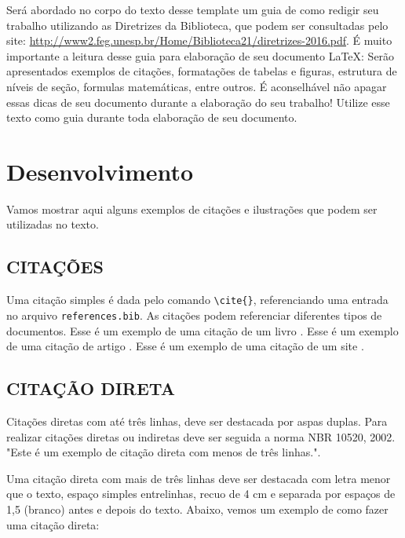 \documentclass[
  12pt,		%
  a4paper,	%
  openright,%
  oneside,	%
  chapter=TITLE,		%
  section=TITLE,		%
  english,	%
  french,	%
  spanish,	%
  brazil	%
]{abntex2}
\begin{document}
    Será abordado no corpo do texto desse template um guia de como redigir seu trabalho utilizando as Diretrizes da Biblioteca, que podem ser consultadas pelo site: \url{http://www2.feg.unesp.br/Home/Biblioteca21/diretrizes-2016.pdf}. É muito importante a leitura desse guia para elaboração de seu documento \LaTeX: Serão apresentados exemplos de citações, formatações de tabelas e figuras, estrutura de níveis de seção, formulas matemáticas, entre outros. É aconselhável não apagar essas dicas de seu documento durante a elaboração do seu trabalho! Utilize esse texto como guia durante toda elaboração de seu documento.
    
    \chapter{Desenvolvimento}
    
        Vamos mostrar aqui alguns exemplos de citações e ilustrações que podem ser utilizadas no texto.
        
        \section{CITAÇÕES}
        
            Uma citação \cite{carbono} simples é dada pelo comando \verb|\cite{}|, referenciando uma entrada no arquivo \verb|references.bib|. As citações podem referenciar diferentes tipos de documentos. Esse é um exemplo de uma citação de um livro \cite{livro}. Esse é um exemplo de uma citação de artigo \cite{artigo}. Esse é um exemplo de uma citação de um site \cite{website}.
        
        \section{CITAÇÃO DIRETA}
        
            Citações diretas com até três linhas, deve ser destacada por aspas duplas. Para realizar citações diretas ou indiretas deve ser seguida a norma NBR 10520, 2002. "Este é um exemplo de citação direta com menos de três linhas."\cite{artigo}.
    
             Uma citação direta com mais de três linhas deve ser destacada com letra menor que o texto, espaço simples entrelinhas, recuo de 4 cm e separada por espaços de 1,5 (branco) antes e depois do texto. Abaixo, vemos um exemplo de como fazer uma citação direta:
            
\end{document}
